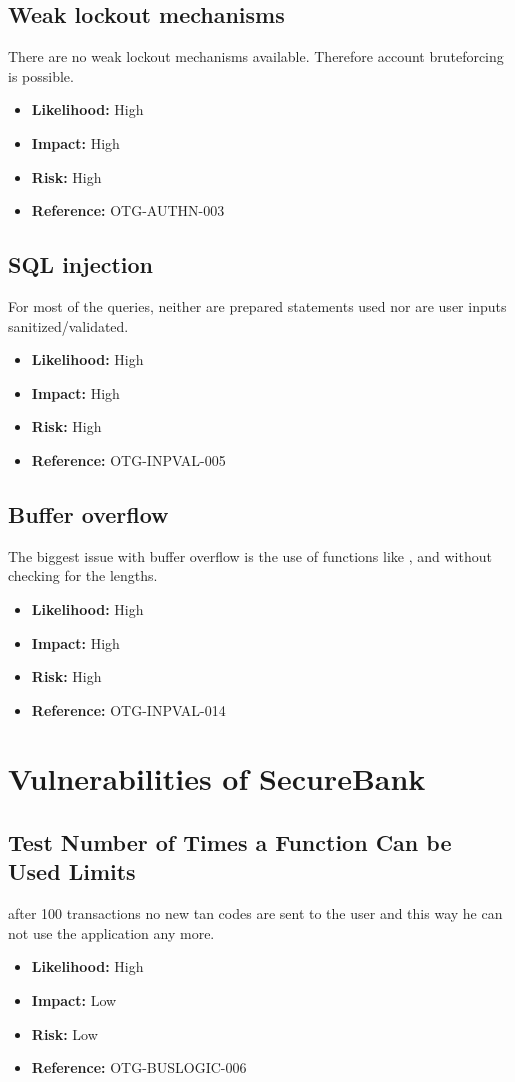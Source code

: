 \subsection{Weak lockout mechanisms}
There are no weak lockout mechanisms available. Therefore account bruteforcing is possible.
\begin{itemize}
	\item \textbf{Likelihood:} High
	\item \textbf{Impact:} High
	\item \textbf{Risk:} High
	\item \textbf{Reference:} OTG-AUTHN-003
\end{itemize}

\subsection{SQL injection}
For most of the queries, neither are prepared statements used nor are user inputs sanitized/validated.
\begin{itemize}
	\item \textbf{Likelihood:} High
	\item \textbf{Impact:} High
	\item \textbf{Risk:} High
	\item \textbf{Reference:} OTG-INPVAL-005
\end{itemize}

\subsection{Buffer overflow}
The biggest issue with buffer overflow is the use of functions like ,  and  without checking for the lengths.
\begin{itemize}
	\item \textbf{Likelihood:} High
	\item \textbf{Impact:} High
	\item \textbf{Risk:} High
	\item \textbf{Reference:} OTG-INPVAL-014
\end{itemize}

\section{Vulnerabilities of SecureBank}

\subsection{Test Number of Times a Function Can be Used Limits}
after 100 transactions no new tan codes are sent to the user and this way he can not use the application any more.\\
\begin{itemize}
	\item \textbf{Likelihood:} High
	\item \textbf{Impact:} Low
	\item \textbf{Risk:} Low
	\item \textbf{Reference:} OTG-BUSLOGIC-006
\end{itemize}